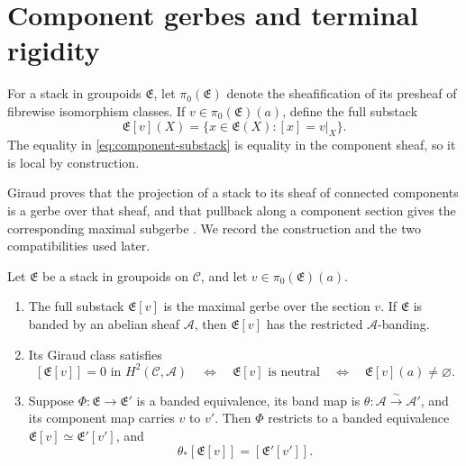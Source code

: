 \section{Component gerbes and terminal rigidity}
\label{sec:gerbe-obstruction}

For a stack in groupoids \(\mathfrak E\), let \(\pi_0(\mathfrak E)\) denote
the sheafification of its presheaf of fibrewise isomorphism classes.  If
\(v\in\pi_0(\mathfrak E)(a)\), define the full substack
\begin{equation}\label{eq:component-substack}
 \mathfrak E[v](X)=
 \{x\in\mathfrak E(X):[x]=v|_X\}.
\end{equation}
The equality in \eqref{eq:component-substack} is equality in the component
sheaf, so it is local by construction.

Giraud proves that
the projection of a stack to its sheaf of connected components is a gerbe
over that sheaf, and that pullback along a component section gives the
corresponding maximal subgerbe
\cite[III, Prop.~2.1.5.3]{Giraud1971}.  We record the construction and the
two compatibilities used later.

\begin{proposition}
\label{prop:standard-component-gerbe-package}
Let \(\mathfrak E\) be a stack in groupoids on \(\mathcal C\), and let
\(v\in\pi_0(\mathfrak E)(a)\).
\begin{enumerate}[label=(\roman*),nosep]
\item The full substack \(\mathfrak E[v]\) is the maximal gerbe over the
      section \(v\).  If \(\mathfrak E\) is banded by an abelian sheaf
      \(\mathscr A\), then \(\mathfrak E[v]\) has the restricted
      \(\mathscr A\)-banding.
\item Its Giraud class satisfies
      \[
      [\mathfrak E[v]]=0\text{ in }H^2(\mathcal C,\mathscr A)
      \quad\Longleftrightarrow\quad
      \mathfrak E[v]\text{ is neutral}
      \quad\Longleftrightarrow\quad
      \mathfrak E[v](a)\ne\varnothing.
      \]
\item Suppose \(\Phi:\mathfrak E\to\mathfrak E'\) is a banded equivalence,
      its band map is \(\theta:\mathscr A\xrightarrow{\sim}\mathscr A'\),
      and its component map carries \(v\) to \(v'\).  Then \(\Phi\)
      restricts to a banded equivalence
      \(\mathfrak E[v]\simeq\mathfrak E'[v']\), and
      \[
      \theta_*[\mathfrak E[v]]=[\mathfrak E'[v']].
      \]
\end{enumerate}
\end{proposition}

